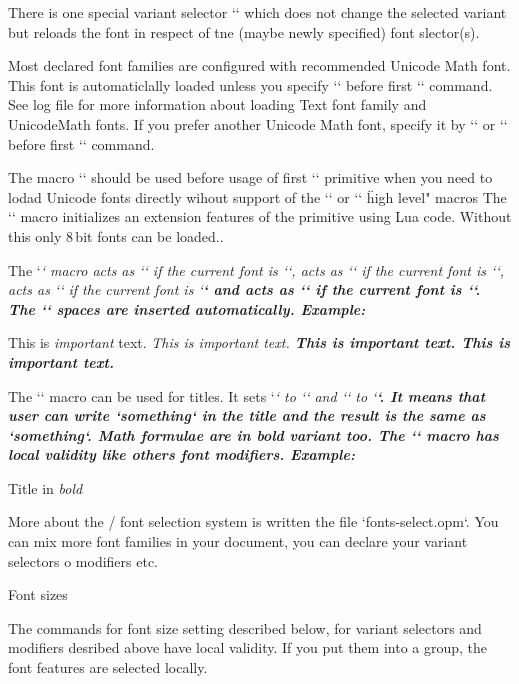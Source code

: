 \new
There is one special variant selector `\currvar` which does not change the
selected variant but reloads the font in respect of tne (maybe newly
specified) font slector(s).

\new 
Most declared font families are configured with recommended Unicode
Math font. This font is automaticlally loaded unless you specify
`\noloadmath` before first `\fontfam` command. See log file for more
information about loading Text font family and UnicodeMath fonts. If you
prefer another Unicode Math font, specify it by ``
or `` before first `\loadfam` command.

\new
The macro `\initunifonts` should be used before usage of first `\font` primitive
when you need to lodad Unicode fonts directly wihout support of the `\fontfam` or
`\loadmath` \"high level" macros\fnote
{The `\initunifonts` macro initializes an extension features of the
\code{\\font} primitive using Lua code. Without this only 8\,bit fonts can be
loaded.}.

The `\em` macro acts as `\it` if the current font is `\rm`, acts as `\rm` if
the current font is `\it`, acts as `\bi` if the current font is `\bf` and
acts as `\bf` if the current font is `\bi`. The `\/` spaces are inserted
automatically. Example:

\begtt
This is {\em important} text.     %
\it This is {\em important} text. %
\bf This is {\em important} text. %
\bi This is {\em important} text. %
\endtt

\new
The `\boldify` macro can be used for titles. It sets `\it` to `\bi` and
`\rm` to `\bf`. It means that user can write `{\it something}` in the title
and the result is the same as `{\bi something}`. Math formulae are in bold 
variant too. The `\boldify` macro has local validity like others font 
modifiers. Example:

\begtt
{\boldify\typosize[14/16] Title in {\it bold}\par}
\endtt

\new
More about the \OpTeX/ font selection system is written the file
`fonts-select.opm`. You can mix more font families in your document, you can
declare your variant selectors o modifiers etc.


\sec Font sizes

The commands for font size setting described below, for variant selectors and
modifiers desribed above have local validity. If you put them into a group, 
the font features are selected locally.

